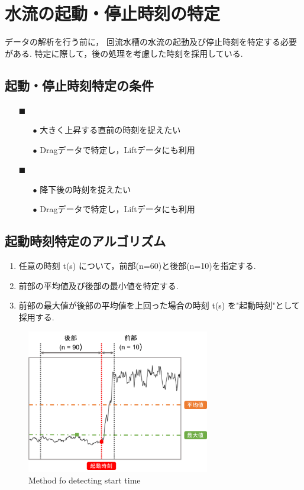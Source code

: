 \documentclass[twocolumn,a4j]{jsarticle}
\begin{document}
\section{水流の起動・停止時刻の特定}
データの解析を行う前に，
回流水槽の水流の起動及び停止時刻を特定する必要がある.
特定に際して，後の処理を考慮した時刻を採用している.

\subsection{起動・停止時刻特定の条件}
\begin{itemize}
    \item [$\blacksquare$] 
        \begin{itemize}
            \item [$\bullet$] 大きく上昇する直前の時刻を捉えたい
            \item [$\bullet$] Dragデータで特定し，Liftデータにも利用
        \end{itemize}
    \item [$\blacksquare$] 
        \begin{itemize}
            \item [$\bullet$] 降下後の時刻を捉えたい
            \item [$\bullet$] Dragデータで特定し，Liftデータにも利用
        \end{itemize}
\end{itemize}
\subsection{起動時刻特定のアルゴリズム}
\begin{enumerate}[(1)]
    \item 任意の時刻 t(s) について，前部(n=60)と後部(n=10)を指定する.
    \item 前部の平均値及び後部の最小値を特定する.
    \item 前部の最大値が後部の平均値を上回った場合の時刻 t(s) を"起動時刻"として採用する.
\end{enumerate}
\begin{figure}[htbp]
    \footnotesize
    \begin{center}
        \includegraphics[width=80mm]{images/start.png}
        \caption{Method fo detecting start time}
    \end{center}
\end{figure}
\end{document}
